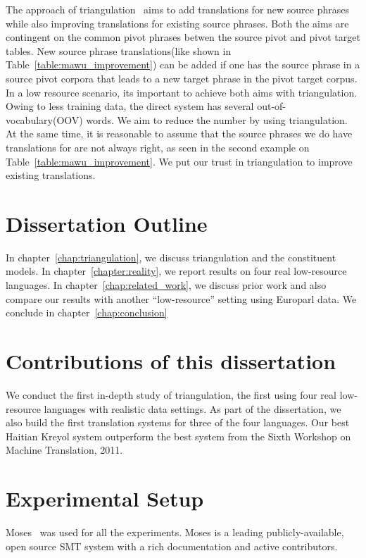 The approach of triangulation~\cite{Cohn:07,Utiyama:07,Nakov:12} aims to add translations for new source phrases while also improving translations for existing source phrases. Both the aims are contingent on the common pivot phrases betwen the source pivot and pivot target tables. New source phrase translations(like shown in Table~\ref{table:mawu_improvement}) can be added if one has the source phrase in a source pivot corpora that leads to a new target phrase in the pivot target corpus. In a low resource scenario, its important to achieve both aims with triangulation. Owing to less training data, the direct system has several out-of-vocabulary(OOV) words. We aim to reduce the number by using triangulation. At the same time, it is reasonable to assume that the source phrases we do have translations for are not always right, as seen in the second example on Table~\ref{table:mawu_improvement}. We put our trust in triangulation to improve existing translations. 

\section{Dissertation Outline}
\label{sec:outline}

In chapter~\ref{chap:triangulation}, we discuss triangulation and the constituent models. In chapter~\ref{chapter:reality}, we report results on four real low-resource languages. In chapter~\ref{chap:related_work}, we discuss prior work and also compare our results with another ``low-resource'' setting using Europarl data. We conclude in chapter~\ref{chap:conclusion}

\section{Contributions of this dissertation}
\label{sec:summary}
We conduct the first in-depth study of triangulation, the first using four real low-resource languages with realistic data settings. As part of the dissertation, we also build the first translation systems for three of the four languages. Our best Haitian Kreyol system outperform the best system from the Sixth Workshop on Machine Translation, 2011. 


\section{Experimental Setup}
\label{sec:setup}


Moses~\cite{Koehn:07} was used for all the experiments. Moses is a leading publicly-available, open source SMT system with a rich documentation and active contributors. 


